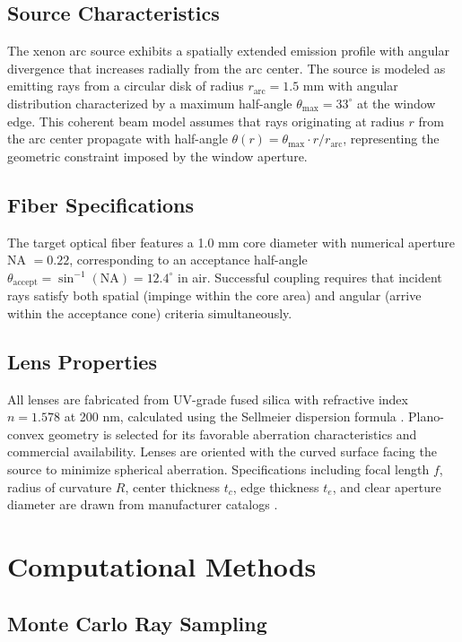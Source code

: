 \subsection{Source Characteristics}

The xenon arc source exhibits a spatially extended emission profile with angular divergence that increases radially from the arc center. The source is modeled as emitting rays from a circular disk of radius $r_{\text{arc}} = 1.5$ mm with angular distribution characterized by a maximum half-angle $\theta_{\max} = 33^\circ$ at the window edge. This coherent beam model assumes that rays originating at radius $r$ from the arc center propagate with half-angle $\theta(r) = \theta_{\max} \cdot r/r_{\text{arc}}$, representing the geometric constraint imposed by the window aperture.

\subsection{Fiber Specifications}

The target optical fiber features a 1.0 mm core diameter with numerical aperture NA $= 0.22$, corresponding to an acceptance half-angle $\theta_{\text{accept}} = \sin^{-1}(\text{NA}) = 12.4^\circ$ in air. Successful coupling requires that incident rays satisfy both spatial (impinge within the core area) and angular (arrive within the acceptance cone) criteria simultaneously.

\subsection{Lens Properties}

All lenses are fabricated from UV-grade fused silica with refractive index $n = 1.578$ at 200 nm, calculated using the Sellmeier dispersion formula \cite{malitson1965}. Plano-convex geometry is selected for its favorable aberration characteristics and commercial availability. Lenses are oriented with the curved surface facing the source to minimize spherical aberration. Specifications including focal length $f$, radius of curvature $R$, center thickness $t_c$, edge thickness $t_e$, and clear aperture diameter are drawn from manufacturer catalogs \cite{thorlabs,edmundoptics}.

\section{Computational Methods}

\subsection{Monte Carlo Ray Sampling}

